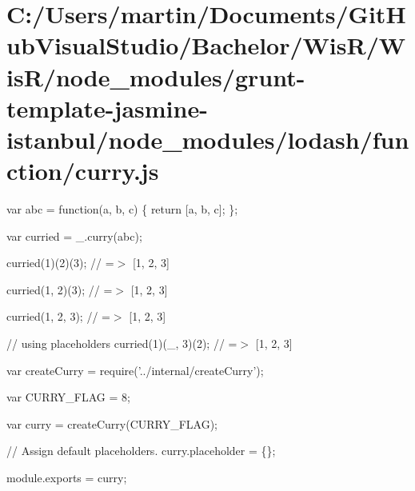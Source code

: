 \hypertarget{_c_1_2_users_2martin_2_documents_2_git_hub_visual_studio_2_bachelor_2_wis_r_2_wis_r_2node_modulee4e1fdc99f78dbc7143a469d3ba32fcd}{}\section{C\+:/\+Users/martin/\+Documents/\+Git\+Hub\+Visual\+Studio/\+Bachelor/\+Wis\+R/\+Wis\+R/node\+\_\+modules/grunt-\/template-\/jasmine-\/istanbul/node\+\_\+modules/lodash/function/curry.\+js}
var abc = function(a, b, c) \{ return \mbox{[}a, b, c\mbox{]}; \};

var curried = \+\_\+.\+curry(abc);

curried(1)(2)(3); // =$>$ \mbox{[}1, 2, 3\mbox{]}

curried(1, 2)(3); // =$>$ \mbox{[}1, 2, 3\mbox{]}

curried(1, 2, 3); // =$>$ \mbox{[}1, 2, 3\mbox{]}

// using placeholders curried(1)(\+\_\+, 3)(2); // =$>$ \mbox{[}1, 2, 3\mbox{]}


\begin{DoxyCodeInclude}
var createCurry = require(\textcolor{stringliteral}{'../internal/createCurry'});

var CURRY\_FLAG = 8;

var curry = createCurry(CURRY\_FLAG);

\textcolor{comment}{// Assign default placeholders.}
curry.placeholder = \{\};

module.exports = curry;
\end{DoxyCodeInclude}
 